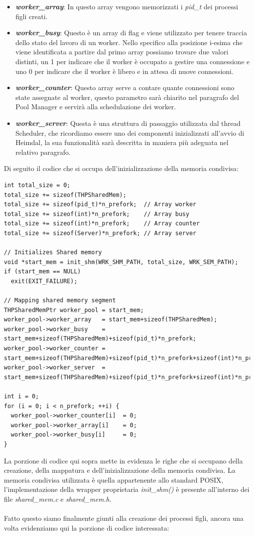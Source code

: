 \documentclass[italian]{tktltiki2}
\begin{document}
\begin{itemize}
  \item \textbf{\emph{worker\_array}}: In questo array vengono memorizzati i \emph{pid\_t} dei processi figli creati.          
  \item \textbf{\emph{worker\_busy}}: Questo è un array di flag e viene utilizzato per tenere traccia dello stato del lavoro di un worker. Nello specifico alla posizione i-esima che viene identificata a partire dal primo array possiamo trovare due valori distinti, un 1 per indicare che il worker è occupato a gestire una connessione e uno 0 per indicare che il worker è libero e in attesa di nuove connessioni.
  \item \textbf{\emph{worker\_counter}}: Questo array serve a contare quante connessioni sono state assegnate al worker, questo parametro sarà chiarito nel paragrafo del Pool Manager e servirà alla schedulazione dei worker.
  \item \textbf{\emph{worker\_server}}: Questa è una struttura di passaggio utilizzata dal thread Scheduler, che ricordiamo essere uno dei componenti inizializzati all'avvio di Heimdal, la sua funzionalità sarà descritta in maniera più adeguata nel relativo paragrafo.
\end{itemize}
Di seguito il codice che si occupa dell'inizializzazione della memoria condivisa:
\begin{lstlisting}
int total_size = 0;
total_size += sizeof(THPSharedMem);
total_size += sizeof(pid_t)*n_prefork;  // Array worker
total_size += sizeof(int)*n_prefork;    // Array busy
total_size += sizeof(int)*n_prefork;    // Array counter
total_size += sizeof(Server)*n_prefork; // Array server

// Initializes Shared memory
void *start_mem = init_shm(WRK_SHM_PATH, total_size, WRK_SEM_PATH);
if (start_mem == NULL)
  exit(EXIT_FAILURE);

// Mapping shared memory segment
THPSharedMemPtr worker_pool = start_mem;
worker_pool->worker_array   = start_mem+sizeof(THPSharedMem);
worker_pool->worker_busy    = start_mem+sizeof(THPSharedMem)+sizeof(pid_t)*n_prefork;
worker_pool->worker_counter = start_mem+sizeof(THPSharedMem)+sizeof(pid_t)*n_prefork+sizeof(int)*n_prefork;
worker_pool->worker_server  = start_mem+sizeof(THPSharedMem)+sizeof(pid_t)*n_prefork+sizeof(int)*n_prefork+sizeof(int)*n_prefork;

int i = 0;
for (i = 0; i < n_prefork; ++i) {
  worker_pool->worker_counter[i]  = 0;
  worker_pool->worker_array[i]    = 0;
  worker_pool->worker_busy[i]     = 0;
}
\end{lstlisting}
La porzione di codice qui sopra mette in evidenza le righe che si occupano della creazione, della mappatura e dell'inizializzazione della memoria condivisa. La memoria condivisa utilizzata è quella appartenente allo standard POSIX, l'implementazione della wrapper proprietaria \emph{init\_shm()} è presente all'interno dei file \emph{shared\_mem.c} e \emph{shared\_mem.h}.
\\
\\
Fatto questo siamo finalmente giunti alla creazione dei processi figli, ancora una volta evidenziamo qui la porzione di codice interessata:
\end{document}
